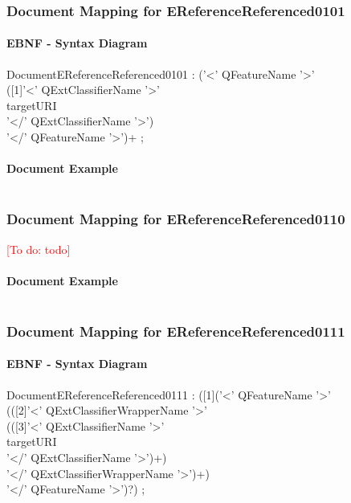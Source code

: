 \documentclass[11pt,a4paper]{article}
\newcommand{\addtodo}[1]{\textcolor{red}{[To do: #1]}\index{TODO: #1}}
\begin{document}
\subsubsection{Document Mapping for EReferenceReferenced0101}
\paragraph{EBNF - Syntax Diagram}
\begin{rail}
DocumentEReferenceReferenced0101 : ('<' QFeatureName '>' \\
([1]'<' QExtClassifierName  '>' \\ 
targetURI \\ 
'</' QExtClassifierName  '>') \\
'</' QFeatureName '>')+ ;
\end{rail}

\paragraph{Document Example}
\inputminted[fontsize=\footnotesize]{xml}{examples/EReferenceReferenced0101.xml}

\subsubsection{Document Mapping for EReferenceReferenced0110}
\addtodo{todo}

\paragraph{Document Example}
\inputminted[fontsize=\footnotesize]{xml}{examples/EReferenceReferenced0110.xml}


\subsubsection{Document Mapping for EReferenceReferenced0111}
\paragraph{EBNF - Syntax Diagram}
\begin{rail}
DocumentEReferenceReferenced0111 : ([1]('<' QFeatureName '>'  \\
(([2]'<' QExtClassifierWrapperName '>'\\
(([3]'<' QExtClassifierName  '>' \\ 
targetURI \\ 
'</' QExtClassifierName  '>')+) \\
'</' QExtClassifierWrapperName '>')+) \\
'</' QFeatureName '>')?) ;
\end{rail}
\end{document}
